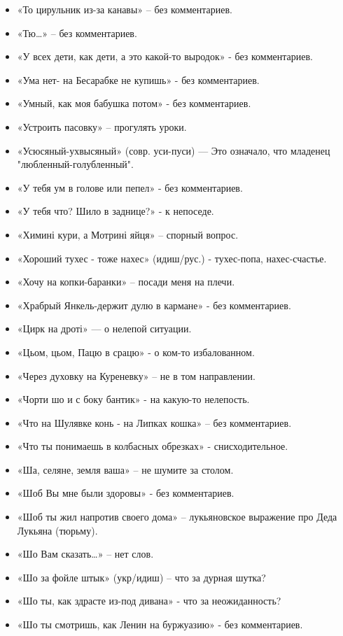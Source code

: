 \begin{itemize}
\item  «То цирульник из-за канавы» – без комментариев.
\item  «Тю…» – без комментариев.
\item  «У всех дети, как дети, а это какой-то выродок» - без комментариев.
\item  «Ума нет- на Бесарабке не купишь» - без комментариев.
\item  «Умный, как моя бабушка потом» - без комментариев.
\item  «Устроить пасовку» – прогулять уроки.
\item  «Усюсяный-ухвысяный» (совр. уси-пуси) — Это означало, что младенец "любленный-голубленный".
\item  «У тебя ум в голове или пепел» - без комментариев.
\item  «У тебя что? Шило в заднице?» - к непоседе.
\item  «Химині кури, а Мотрині яйця» – спорный вопрос.
\item  «Хороший тухес - тоже нахес» (идиш/рус.) - тухес-попа, нахес-счастье. 
\item  «Хочу на копки-баранки» – посади меня на плечи.
\item  «Храбрый  Янкель-держит дулю в кармане» - без комментариев.
\item  «Цирк на дроті» — о нелепой ситуации.
\item  «Цьом, цьом, Пацю в срацю» - о ком-то избалованном.
\item  «Через духовку на Куреневку» – не в том направлении.
\item  «Чорти шо и с боку бантик» - на какую-то нелепость.
\item  «Что на Шулявке конь - на Липках кошка» – без комментариев.
\item  «Что ты понимаешь в колбасных обрезках» - снисходительное.
\item  «Ша, селяне, земля ваша» – не шумите за столом.
\item  «Шоб Вы мне были здоровы» - без комментариев.
\item  «Шоб ты жил напротив своего дома» – лукьяновское выражение про Деда Лукьяна (тюрьму).
\item  «Шо Вам сказать…» – нет слов.
\item  «Шо за фойле штык» (укр/идиш) – что за дурная шутка?
\item  «Шо ты, как здрасте из-под дивана» - что за неожиданность?
\item  «Шо ты смотришь, как Ленин на буржуазию» - без комментариев.

\end{itemize}
